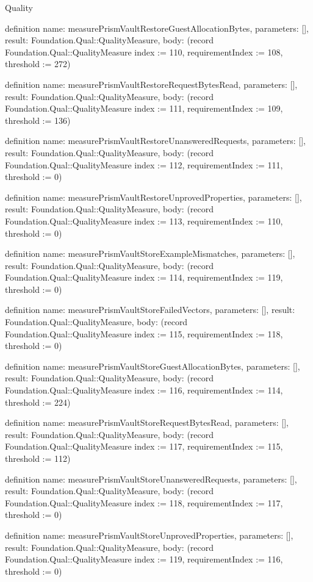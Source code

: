 \begin{lexlean}{Quality}
\begin{semanticmodule}
definition{
  name: measurePrismVaultRestoreGuestAllocationBytes,
  parameters: [],
  result: Foundation.Qual::QualityMeasure,
  body: (record Foundation.Qual::QualityMeasure {index := 110, requirementIndex := 108, threshold := 272})
}

definition{
  name: measurePrismVaultRestoreRequestBytesRead,
  parameters: [],
  result: Foundation.Qual::QualityMeasure,
  body: (record Foundation.Qual::QualityMeasure {index := 111, requirementIndex := 109, threshold := 136})
}

definition{
  name: measurePrismVaultRestoreUnansweredRequests,
  parameters: [],
  result: Foundation.Qual::QualityMeasure,
  body: (record Foundation.Qual::QualityMeasure {index := 112, requirementIndex := 111, threshold := 0})
}

definition{
  name: measurePrismVaultRestoreUnprovedProperties,
  parameters: [],
  result: Foundation.Qual::QualityMeasure,
  body: (record Foundation.Qual::QualityMeasure {index := 113, requirementIndex := 110, threshold := 0})
}

definition{
  name: measurePrismVaultStoreExampleMismatches,
  parameters: [],
  result: Foundation.Qual::QualityMeasure,
  body: (record Foundation.Qual::QualityMeasure {index := 114, requirementIndex := 119, threshold := 0})
}

definition{
  name: measurePrismVaultStoreFailedVectors,
  parameters: [],
  result: Foundation.Qual::QualityMeasure,
  body: (record Foundation.Qual::QualityMeasure {index := 115, requirementIndex := 118, threshold := 0})
}

definition{
  name: measurePrismVaultStoreGuestAllocationBytes,
  parameters: [],
  result: Foundation.Qual::QualityMeasure,
  body: (record Foundation.Qual::QualityMeasure {index := 116, requirementIndex := 114, threshold := 224})
}

definition{
  name: measurePrismVaultStoreRequestBytesRead,
  parameters: [],
  result: Foundation.Qual::QualityMeasure,
  body: (record Foundation.Qual::QualityMeasure {index := 117, requirementIndex := 115, threshold := 112})
}

definition{
  name: measurePrismVaultStoreUnansweredRequests,
  parameters: [],
  result: Foundation.Qual::QualityMeasure,
  body: (record Foundation.Qual::QualityMeasure {index := 118, requirementIndex := 117, threshold := 0})
}

definition{
  name: measurePrismVaultStoreUnprovedProperties,
  parameters: [],
  result: Foundation.Qual::QualityMeasure,
  body: (record Foundation.Qual::QualityMeasure {index := 119, requirementIndex := 116, threshold := 0})
}


\end{semanticmodule}
\end{lexlean}
